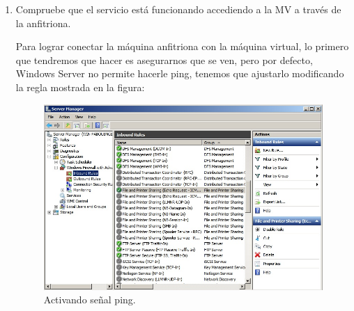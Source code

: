 \documentclass[paper=a4, fontsize=11pt]{scrartcl} %
\numberwithin{equation}{section} %
\numberwithin{figure}{section} %
\numberwithin{table}{section} %
\begin{document}
\begin{enumerate}
\begin{itemize}
			\item \textbf{JBoss}\cite{WF_official}(Actualmente, llamado \textit{WildFly}), que en la
			página oficial se nos describe como un servidor de aplicaciones implementado en Java en
			código abierto desarrollado por \textit{RedHat} bajo la licencia de software libre
			\href{https://www.gnu.org/licenses/lgpl.html}{\textbf{GNU Lesser General Public License(LGPL)}}.
			
			\item Al igual que WildFly, GlassFish es un servidor de aplicaciones implementado en Java
			en código abierto y desarrollado por \textit{Oracle Corporation} bajo una licencia dual
			\href{https://opensource.org/licenses/CDDL-1.0}{\textbf{Common Development and Distribution
			License (CDDL)}}\footnote{En este enlace, no he usado el oficial, es decir, el de Oracle
			porque me dio la sensación de que dirigía a un archivo temporal pero lo dejo aquí:
			\href{http://www.oracle.com/technetwork/middleware/oedq/help/edq11help-2152391.pdf}{\textbf{CDDL}}}
			\& \href{https://www.gnu.org/licenses/gpl.html}{\textbf{GPL}}
			con una ligera modificación.\cite{GF_official}\cite{GF_install}
		\end{itemize}
		
	\subsection{Windows: IIS}
		\item Compruebe que el servicio está funcionando accediendo a la MV a través de la anfitriona.
		
		Para lograr conectar la máquina anfitriona con la máquina virtual, lo primero que tendremos que
		hacer es asegurarnos que se ven, pero por defecto, Windows Server no permite hacerle ping,
		tenemos que ajustarlo modificando la regla mostrada en la figura:
		
		\begin{figure}[H]
			\centering
			\includegraphics[width=15cm]{Ejercicio_15a.jpg}
			\caption{Activando señal ping.}
			\label{fig:ping}
		\end{figure}
		

\end{enumerate}
\end{document}
